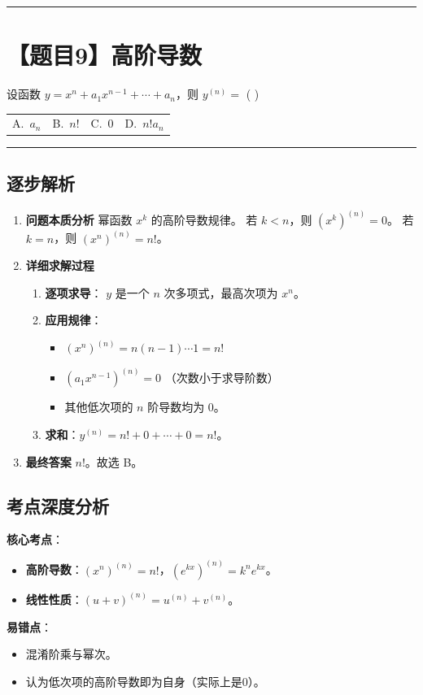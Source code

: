 \documentclass[UTF8,10pt]{ctexart}
\makeatletter
\newenvironment{redenv}{\color{red}}{}
\newenvironment{detailedanalysis}{%
    \color{red}
    \begin{enumerate}[label=\textbf{第\arabic*步：}, leftmargin=*, align=left, itemsep=0pt, parsep=0pt, topsep=0pt, partopsep=0pt]
}{%
    \end{enumerate}
}
\newenvironment{conceptbox}{%
    \begin{tcolorbox}[colback=red!5, colframe=red!50!black, title=概念解析, fonttitle=\bfseries, top=2pt, bottom=2pt, left=2pt, right=2pt]
}{%
    \end{tcolorbox}
}
\newcommand{\problemrule}{\par\filbreak\noindent\rule{\textwidth}{1.5pt}\vspace{-0.5em}}
\newcommand{\analysisrule}{\noindent\rule{\textwidth}{0.8pt}\vspace{-0.5em}}
\newcommand{\fourchoices}[4]{
    \par\noindent
    \begin{tabular*}{\linewidth}{@{\extracolsep{\fill}}llll}
        A.~#1 & B.~#2 & C.~#3 & D.~#4
    \end{tabular*}
}
\makeatother
\begin{document}
\problemrule
\section*{【题目9】高阶导数}
设函数 $y = x^n + a_1 x^{n-1} + \cdots + a_n$，则 $y^{(n)} = $ ( \quad )
\fourchoices{$a_n$}{$n!$}{0}{$n!a_n$}

\begin{redenv}
\analysisrule
\subsection*{逐步解析}

\begin{detailedanalysis}
\item \textbf{问题本质分析}
幂函数 $x^k$ 的高阶导数规律。
若 $k < n$，则 $(x^k)^{(n)} = 0$。
若 $k = n$，则 $(x^n)^{(n)} = n!$。

\item \textbf{详细求解过程}
\begin{enumerate}[label=(\alph*)]
    \item \textbf{逐项求导}：
    $y$ 是一个 $n$ 次多项式，最高次项为 $x^n$。
    \item \textbf{应用规律}：
    \begin{itemize}
        \item $(x^n)^{(n)} = n(n-1)\cdots 1 = n!$
        \item $(a_1 x^{n-1})^{(n)} = 0$ （次数小于求导阶数）
        \item 其他低次项的 $n$ 阶导数均为 0。
    \end{itemize}
    \item \textbf{求和}：$y^{(n)} = n! + 0 + \cdots + 0 = n!$。
\end{enumerate}

\item \textbf{最终答案}
$n!$。故选 B。
\end{detailedanalysis}

\subsection*{考点深度分析}
\begin{conceptbox}
\textbf{核心考点}：
\begin{itemize}
    \item \textbf{高阶导数}：$(x^n)^{(n)} = n!$，$(e^{kx})^{(n)} = k^n e^{kx}$。
    \item \textbf{线性性质}：$(u+v)^{(n)} = u^{(n)} + v^{(n)}$。
\end{itemize}
\textbf{易错点}：
\begin{itemize}
    \item 混淆阶乘与幂次。
    \item 认为低次项的高阶导数即为自身（实际上是0）。
\end{itemize}
\end{conceptbox}
\end{redenv}
\end{document}
